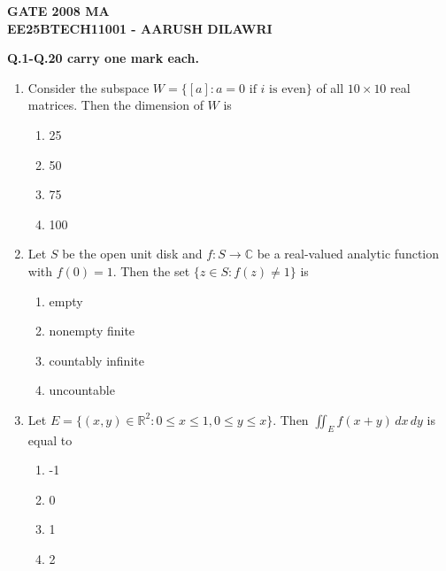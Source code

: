 \documentclass[journal]{IEEEtran}
\numberwithin{equation}{enumi}
\numberwithin{figure}{enumi}
\begin{document}


\begin{center}
    \LARGE \textbf{GATE 2008 MA}\\[0.5em]
    \large \textbf{EE25BTECH11001 - AARUSH DILAWRI}
\end{center}
\begin{center}
 \textbf{Q.1-Q.20 carry one mark each.}
\end{center}
\vspace{0.25em}
\begin{enumerate}

\item Consider the subspace \(W = \{[a]: a=0 \text{ if } i \text{ is even}\}\) of all \(10 \times 10\) real matrices. Then the dimension of \(W\) is
\hfill{}
\begin{multicols}{4}
\begin{enumerate}
\item 25
\item 50
\item 75
\item 100
\end{enumerate}
\end{multicols}

\item Let \(S\) be the open unit disk and \(f: S \to \mathbb{C}\) be a real-valued analytic function with \(f(0) = 1\). Then the set \(\{z \in S: f(z) \neq 1\}\) is
\hfill{}
\begin{multicols}{2}
\begin{enumerate}
\item empty
\item nonempty finite
\item countably infinite
\item uncountable
\end{enumerate}
\end{multicols}

\item Let \(E = \{(x, y) \in \mathbb{R}^2: 0 \leq x \leq 1, 0 \leq y \leq x\}\). Then \(\displaystyle \iint_{E} f(x + y) \, dx\, dy\) is equal to
\hfill{}
\begin{multicols}{4}
\begin{enumerate}
\item -1
\item 0
\item 1
\item 2
\end{enumerate}
\end{multicols}


\end{enumerate}
\end{document}
